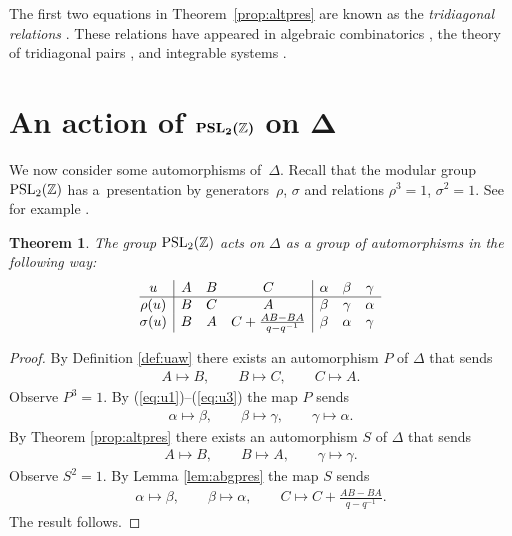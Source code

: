 \documentclass[pdftex]{sigma}
\numberwithin{equation}{section}
\newtheorem{Theorem}{Theorem}[section]
\begin{document}
\begin{Note}
The f\/irst two equations
in Theorem~\ref{prop:altpres}
are known as the {\it tridiagonal relations}
\cite[De\-f\/i\-nition~3.9]{qSerre}.
These
relations
have appeared in algebraic combinatorics
\cite[Lemma 5.4]{tersub3},
 the theory of tridiagonal pairs
\cite{TD00,
IT:qRacah,
LS99,
qSerre,
madrid},
and integrable systems
\cite{bas2,bas1,bas3,bas4,bas5,bas6,bas7,bas8,basnc}.
\end{Note}



\section[An action of ${\rm  {PSL}}_2(\mathbb Z)$ on $\Delta$]{An action of $\boldsymbol{{\rm  {PSL}}_2(\mathbb Z)}$ on $\boldsymbol{\Delta}$}

We now consider
some automorphisms of~$\Delta $.
Recall that the modular group
${\rm  {PSL}}_2(\mathbb Z)$ has a~presentation
by generators~$\rho$, $\sigma$ and
relations $\rho^3=1$, $\sigma^2=1$.
See for example \cite{alpern}.


\begin{Theorem}
\label{thm:try}
The group
${\rm  {PSL}}_2(\mathbb Z)$ acts on
$\Delta $ as a group of automorphisms in the following way:
\[
\begin{array}{@{}c| ccc | c c c}
u &  A & B  & C
&  \alpha & \beta  & \gamma
\\
\hline
\rho(u) &  B & C & A
&  \beta  & \gamma & \alpha
\\
\sigma(u) &  B & A & C+\frac{AB-BA}{q-q^{-1}}
&  \beta & \alpha & \gamma
\end{array}
\]
\end{Theorem}

\begin{proof}
By Def\/inition
\ref{def:uaw} there exists an automorphism
$P$ of $\Delta $ that sends
\begin{gather*}
A \mapsto B,
\qquad
B \mapsto C,
\qquad
C \mapsto A.
\end{gather*}
Observe $P^3=1$. By
(\ref{eq:u1})--(\ref{eq:u3})
the map $P$ sends
\begin{gather*}
\alpha \mapsto \beta,
\qquad
\beta \mapsto \gamma,
\qquad
\gamma \mapsto \alpha.
\end{gather*}
By Theorem
\ref{prop:altpres} there exists
an automorphism
$S$ of $\Delta $ that sends
\begin{gather*}
A \mapsto B,
 \qquad
B \mapsto A,
\qquad
\gamma \mapsto \gamma.
\end{gather*}
Observe $S^2=1$. By
Lemma
\ref{lem:abgpres}
the map $S$
sends
\begin{gather*}
\alpha \mapsto \beta,
\qquad
\beta \mapsto \alpha,
\qquad
C \mapsto C + \frac{AB-BA}{q-q^{-1}}.
\end{gather*}
The result follows.
\end{proof}
\end{document}
